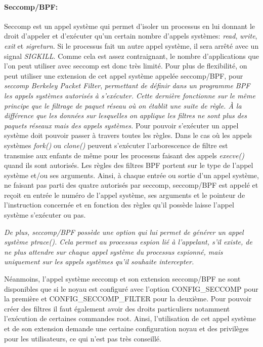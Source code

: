 \paragraph{Seccomp/BPF:}

Seccomp \citet{INTERCEPTION:seccomp_bpf} est un appel système qui permet d'isoler
un processus en lui donnant le droit d'appeler et d'exécuter qu'un certain
nombre d'appels systèmes: \textit{read}, \textit{write}, \textit{exit} et
\textit{sigreturn}. Si le processus fait un autre appel système, il sera arrêté
avec un signal \textit{SIGKILL}. Comme cela est assez contraignant, le nombre
d'applications que l'on peut utiliser avec seccomp est donc très limité. Pour
plus de flexibilité, on peut utiliser une extension de cet appel système appelée
seccomp/BPF, pour \textit{seccomp Berkeley Packet Filter}, \textit{permettant de définir
dans un programme BPF \citet{INTERCEPTION:bpf} les appels systèmes autorisés à
s'exécuter. Cette dernière fonctionne sur le même principe que le filtrage de
paquet réseau où on établit une suite de règle. À la différence que les données
sur lesquelles on applique les filtres ne sont plus des paquets réseaux mais des
appels systèmes.} Pour pouvoir s'exécuter un appel système doit pouvoir passer à
travers toutes les règles. Dans le cas où les appels systèmes \textit{fork()} ou
\textit{clone()} peuvent s'exécuter l'arborescence de filtre est transmise aux
enfants de même pour les processus faisant des appels \textit{execve()} quand
ils sont autorisés. Les règles des filtres BPF portent sur le type de l'appel
système et/ou ses arguments. Ainsi, à chaque entrée ou sortie d'un appel
système, ne faisant pas parti des quatre autorisés par seccomp, seccomp/BPF est
appelé et reçoit en entrée le numéro de l'appel système, ses arguments et le
pointeur de l'instruction concernée et en fonction des règles qu'il possède
laisse l'appel système s'exécuter ou pas.

\textit{ De plus, seccomp/BPF possède une option qui lui permet de générer un
  appel système ptrace(). Cela permet au processus espion lié à l'appelant, s'il
  existe, de ne plus attendre sur chaque appel système du processus espionné,
  mais uniquement sur les appels systèmes qu'il souhaite intercepter.}

Néanmoins, l'appel système seccomp et son extension seccomp/BPF ne sont
disponibles que si le noyau est configuré avec l'option CONFIG\_SECCOMP pour la
première et CONFIG\_SECCOMP\_FILTER pour la deuxième. Pour pouvoir créer des
filtres il faut également avoir des droits particuliers notamment l'exécution de
certaines commandes root. Ainsi, l'utilisation de cet appel système et de son
extension demande une certaine configuration noyau et des privilèges pour les
utilisateurs, ce qui n'est pas très conseillé.

